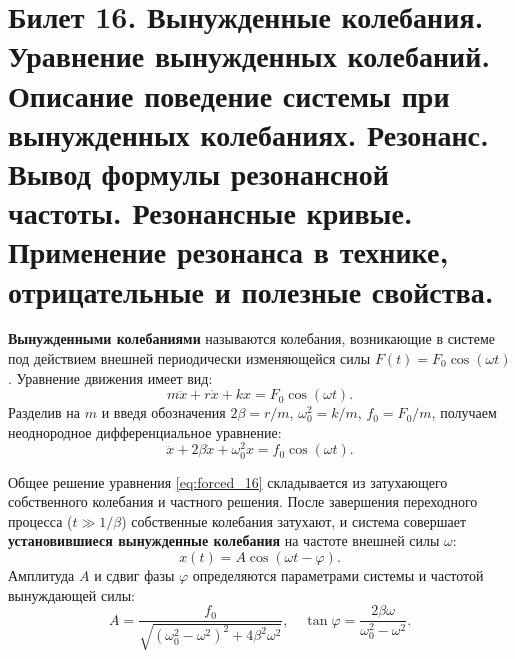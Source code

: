 \section{Билет 16. Вынужденные колебания. Уравнение вынужденных колебаний. Описание поведение системы при вынужденных колебаниях. Резонанс. Вывод формулы резонансной частоты. Резонансные кривые. Применение резонанса в технике, отрицательные и полезные свойства.}

\begin{definition}
\textbf{Вынужденными колебаниями} называются колебания, возникающие в системе под действием внешней периодически изменяющейся силы $F(t) = F_0 \cos(\omega t)$. Уравнение движения имеет вид:
\begin{equation}
    m\ddot{x} + r\dot{x} + kx = F_0 \cos(\omega t).
\end{equation}
Разделив на $m$ и введя обозначения $2\beta = r/m$, $\omega_0^2 = k/m$, $f_0 = F_0/m$, получаем неоднородное дифференциальное уравнение:
\begin{equation}
    \ddot{x} + 2\beta \dot{x} + \omega_0^2 x = f_0 \cos(\omega t). \label{eq:forced_16}
\end{equation}
\end{definition}

\begin{theorem}
Общее решение уравнения \eqref{eq:forced_16} складывается из затухающего собственного колебания и частного решения. После завершения переходного процесса ($t \gg 1/\beta$) собственные колебания затухают, и система совершает \textbf{установившиеся вынужденные колебания} на частоте внешней силы $\omega$:
\begin{equation}
    x(t) = A \cos(\omega t - \varphi).
\end{equation}
Амплитуда $A$ и сдвиг фазы $\varphi$ определяются параметрами системы и частотой вынуждающей силы:
\begin{equation}
    A = \frac{f_0}{\sqrt{(\omega_0^2 - \omega^2)^2 + 4\beta^2 \omega^2}}, \quad \tan\varphi = \frac{2\beta\omega}{\omega_0^2 - \omega^2}. \label{eq:amplitude_phase}
\end{equation}
\end{theorem}

